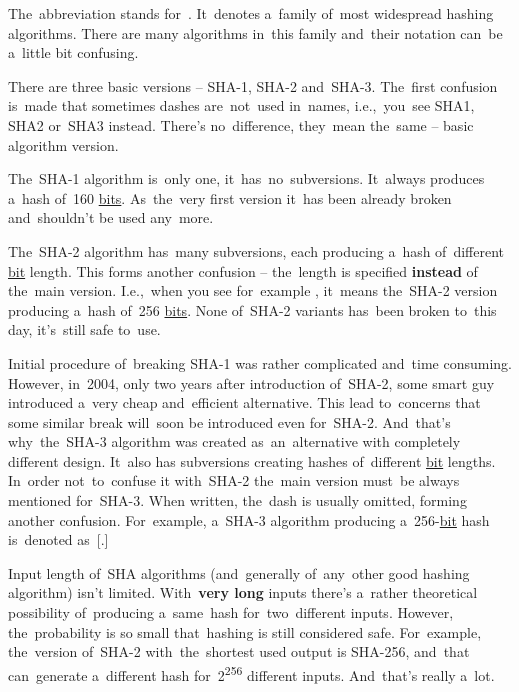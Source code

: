 \label{sha}
The~abbreviation stands for~.
It~denotes a~family of~most widespread hashing algorithms.
There are many algorithms in~this family and~their notation can~be a~little bit confusing.

There are three basic versions -- \mbox{SHA-1}, \mbox{SHA-2} \mbox{and SHA-3}.
The~first confusion is~made that sometimes dashes are~not~used in~names, i.e.,~you~see \mbox{SHA1}, \mbox{SHA2} \mbox{or SHA3} instead.
There's no~difference, they~mean the~same -- basic algorithm version.

\mbox{The SHA-1} algorithm is~only one, it~has~no~subversions.
It~always produces a~hash of~160 \hyperref[bitsbytes]{bits}.
As~the~very first version it~has been already broken and~shouldn't be used any~more.

\mbox{The SHA-2} algorithm has~many subversions, each producing a~hash of~different \hyperref[bitsbytes]{bit} length.
This forms another confusion -- the~length is specified \textbf{instead} of the~main version.
I.e.,~when you see for~example , it~means \mbox{the SHA-2} version producing a~hash of~256 \hyperref[bitsbytes]{bits}.
None \mbox{of SHA-2} variants has~been broken to~this day, it's~still safe to~use.

Initial procedure of~breaking \mbox{SHA-1} was rather complicated and~time consuming.
However, in~2004, only two years after introduction \mbox{of SHA-2}, some smart guy introduced a~very cheap and~efficient alternative.
This lead to~concerns that some similar break will~soon be introduced even \mbox{for SHA-2.}
And~that's \mbox{why the SHA-3} algorithm was created as~an~alternative with completely different design.
It~also has subversions creating hashes of~different \hyperref[bitsbytes]{bit} lengths.
In~order not~to~confuse it \mbox{with SHA-2} the~main version must~be always mentioned \mbox{for SHA-3.}
When written, the~dash is usually omitted, forming another confusion.
For~example, \mbox{a SHA-3} algorithm producing \mbox{a 256-\hyperref[bitsbytes]{bit}} hash is~denoted as~[.]
\newline

\note Input length of~SHA algorithms (and~generally of~any~other good hashing algorithm) isn't limited.
With~\textbf{very long} inputs there's a~rather theoretical possibility of~producing a~same~hash for~two~different inputs.
However, the~probability is so small that~hashing is still considered safe.
For~example, the~version \mbox{of SHA-2} with~the~shortest used output is \mbox{SHA-256}, and~that can~generate a~different hash for~2\textsuperscript{256} different inputs.
And~that's really a~lot.
\newpage
